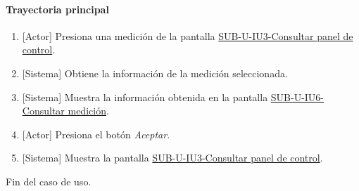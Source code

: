\paragraph{Trayectoria principal}
	\begin{enumerate}
		\item {[Actor]} Presiona una medición de la pantalla \hyperref[fig:sub-u-iu3]{SUB-U-IU3-Consultar panel de control}.
		\item {[Sistema]} Obtiene la información de la medición seleccionada.
		\item {[Sistema]} Muestra la información obtenida en la pantalla \hyperref[fig:sub-u-iu6]{SUB-U-IU6-Consultar medición}.
		\item {[Actor]} Presiona el botón \textit{Aceptar}.
		\item {[Sistema]} Muestra la pantalla \hyperref[fig:sub-u-iu3]{SUB-U-IU3-Consultar panel de control}.
	\end{enumerate}
	Fin del caso de uso.

